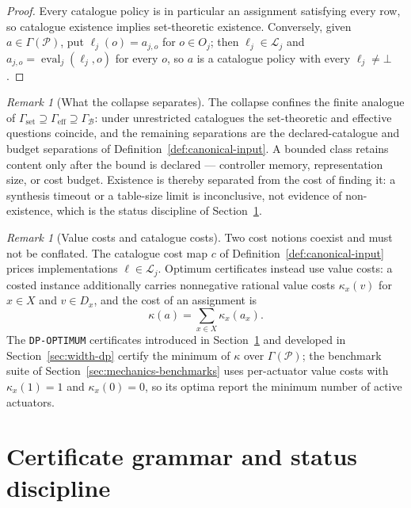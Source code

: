 \documentclass[11pt]{article}
\theoremstyle{plain}
\theoremstyle{definition}
\theoremstyle{remark}
\newtheorem{remark}[theorem]{Remark}
\newcommand{\GammaSet}{\Gamma_{\mathrm{set}}}
\newcommand{\GammaEff}{\Gamma_{\mathrm{eff}}}
\newcommand{\GammaB}{\Gamma_{\mathcal B}}
\begin{document}
\begin{proof}
Every catalogue policy is in particular an assignment satisfying every row,
so catalogue existence implies set-theoretic existence.  Conversely, given
\(a\in\Gamma(\mathcal P)\), put \(\ell_j(o)=a_{j,o}\) for \(o\in O_j\);
then \(\ell_j\in\mathcal L_j\) and
\(a_{j,o}=\operatorname{eval}_j(\ell_j,o)\) for every \(o\), so \(a\) is a
catalogue policy with every \(\ell_j\ne\bot\).
\end{proof}

\begin{remark}[What the collapse separates]
\label{rem:collapse-separates}
The collapse confines the finite analogue of
\(\GammaSet\supseteq\GammaEff\supseteq\GammaB\): under unrestricted catalogues
the set-theoretic and effective questions coincide, and the remaining
separations are the declared-catalogue and budget separations of
Definition~\ref{def:canonical-input}.  A bounded class retains content only
after the bound is declared --- controller memory, representation size, or
cost budget.  Existence is thereby separated from the cost of finding it: a
synthesis timeout or a table-size limit is inconclusive, not evidence of
non-existence, which is the status discipline of
Section~\ref{sec:certificates}.
\end{remark}

\begin{remark}[Value costs and catalogue costs]
\label{rem:costs}
Two cost notions coexist and must not be conflated.  The catalogue cost map
\(c\) of Definition~\ref{def:canonical-input} prices implementations
\(\ell\in\mathcal L_j\).  Optimum certificates instead use value costs: a
costed instance additionally carries nonnegative rational value costs
\(\kappa_x(v)\) for \(x\in X\) and \(v\in D_x\), and the cost of an
assignment is
\[
  \kappa(a)=\sum_{x\in X}\kappa_x(a_x).
\]
The \texttt{DP-OPTIMUM} certificates introduced in
Section~\ref{sec:certificates} and developed in Section~\ref{sec:width-dp}
certify the minimum of \(\kappa\) over \(\Gamma(\mathcal P)\); the benchmark suite of
Section~\ref{sec:mechanics-benchmarks} uses per-actuator value costs with
\(\kappa_x(1)=1\) and \(\kappa_x(0)=0\), so its optima report the minimum
number of active actuators.
\end{remark}

\section{Certificate grammar and status discipline}
\label{sec:certificates}
\end{document}
